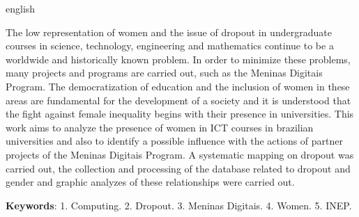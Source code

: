 
\begin{resumo}[Abstract]
 \begin{otherlanguage*}{english}

The low representation of women and the issue of dropout in undergraduate courses in science, technology, engineering and mathematics continue to be a worldwide and historically known problem. In order to minimize these problems, many projects and programs are carried out, such as the Meninas Digitais Program. The democratization of education and the inclusion of women in these areas are fundamental for the development of a society and it is understood that the fight against female inequality begins with their presence in universities. This work aims to analyze the presence of women in ICT courses in brazilian universities and also to identify a possible influence with the actions of partner projects of the Meninas Digitais Program. A systematic mapping on dropout was carried out, the collection and processing of the database related to dropout and gender and graphic analyzes of these relationships were carried out.

   \textbf{Keywords}: 1. Computing. 2. Dropout. 3. Meninas Digitais. 4. Women. 5. INEP.
 \end{otherlanguage*}
\end{resumo}
